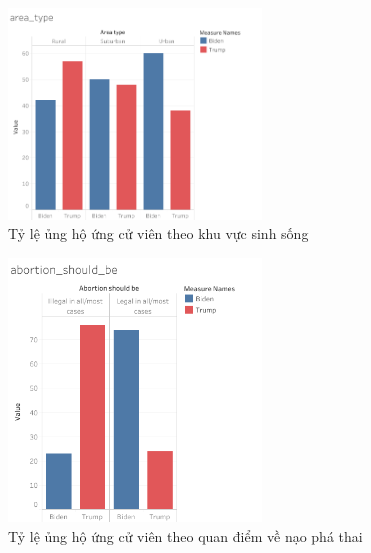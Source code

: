\documentclass[14pt, a4paper]{article}
\numberwithin{equation}{section}
\numberwithin{figure}{section}
\numberwithin{dl}{section}
\numberwithin{md}{section}
\numberwithin{bd}{section}
\numberwithin{dn}{section}
\numberwithin{hq}{section}
\begin{document}
    \begin{figure}[h!]
        \centering
        \includegraphics[width=0.6\textwidth]{figures/area_type.png}
        \caption{Tỷ lệ ủng hộ ứng cử viên theo khu vực sinh sống}
    \end{figure}


    \begin{figure}[h!]
        \centering
        \includegraphics[width=0.6\textwidth]{figures/abortion_should_be.png}
        \caption{Tỷ lệ ủng hộ ứng cử viên theo quan điểm về nạo phá thai}
    \end{figure}
\end{document}
